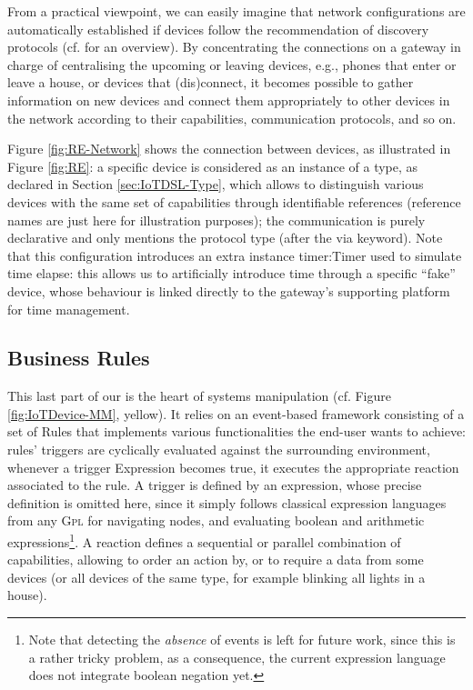 From a practical viewpoint, we can easily imagine that network configurations are automatically established if devices follow the recommendation of discovery protocols (cf. \cite{} for an overview). By concentrating the connections on a gateway in charge of centralising the upcoming or leaving devices, e.g., phones that enter or leave a house, or devices that (dis)connect, it becomes possible to gather information on new devices and connect them appropriately to other devices in the network according to their capabilities, communication protocols, and so on.

Figure \ref{fig:RE-Network} shows the connection between devices, as illustrated in Figure \ref{fig:RE}: a specific device is considered as an instance of a type, as declared in Section \ref{sec:IoTDSL-Type}, which allows to distinguish various devices with the same set of capabilities through identifiable references (reference names are just here for illustration purposes); the communication is purely declarative and only mentions the protocol type (after the \textsf{via} keyword). Note that this configuration introduces an extra instance \textsf{timer:Timer} used to simulate time elapse: this allows us to artificially introduce time through a specific ``fake'' device, whose behaviour is linked directly to the gateway's supporting platform for time management.


	
\subsection{Business Rules}
\label{sec:IoTDSL-BusinessRules}

This last part of our \DSL is the heart of \IOT systems manipulation (cf. Figure \ref{fig:IoTDevice-MM}, yellow). It relies on an event-based framework consisting of a set of \textsf{Rule}s that implements various functionalities the end-user wants to achieve: rules' \textsf{trigger}s are cyclically evaluated against the surrounding environment, whenever a \textsf{trigger} \textsf{Expression} becomes true, it executes the appropriate \textsf{reaction} associated to the rule. A \textsf{trigger} is defined by an expression, whose precise definition is omitted here, since it simply follows classical expression languages from any \textsc{Gpl} for navigating nodes, and evaluating boolean and arithmetic expressions\footnote{Note that detecting the \emph{absence} of events is left for future work, since this is a rather tricky problem, as a consequence, the current expression language does not integrate boolean negation yet.}. A \textsf{reaction} defines a sequential or parallel combination of capabilities, allowing to order an action by, or to require a data from some devices (or all devices of the same type, for example blinking all lights in a house).
	
